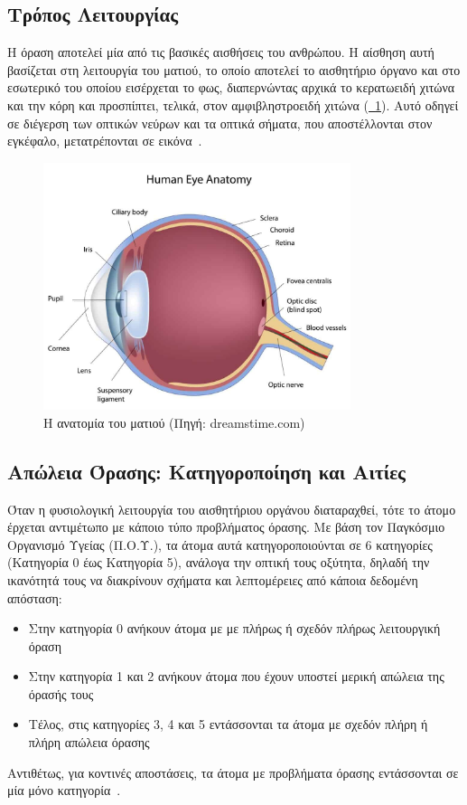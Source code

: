 \subsection{Τρόπος Λειτουργίας}\label{subsec:visionDefinition}
Η όραση αποτελεί μία από τις βασικές αισθήσεις του ανθρώπου. Η αίσθηση αυτή βασίζεται στη λειτουργία του ματιού, το οποίο αποτελεί το αισθητήριο όργανο και στο εσωτερικό του οποίου εισέρχεται το φως, διαπερνώντας αρχικά το κερατωειδή χιτώνα και την κόρη και προσπίπτει, τελικά, στον αμφιβληστροειδή χιτώνα (\hyperref[fig:eye_anatomy]{\schema~\ref*{fig:eye_anatomy}}). Αυτό οδηγεί σε διέγερση των οπτικών νεύρων και τα οπτικά σήματα, που αποστέλλονται στον εγκέφαλο, μετατρέπονται σε εικόνα~\cite{nationaleyeinstitute_2022_how}\cite{anspaugh_2022_vision}.

\begin{figure}[!h]
  \centering
  \includegraphics[width=90mm]{images/eye_anatomy.jpg}
  \caption[Η ανατομία του ματιού]{Η ανατομία του ματιού {\footnotesize(Πηγή: dreamstime.com)}}\label{fig:eye_anatomy}
\end{figure}

\subsection{Απώλεια Όρασης: Κατηγοροποίηση και Αιτίες}\label{subsec:visionCauses}
Όταν η φυσιολογική λειτουργία του αισθητήριου οργάνου διαταραχθεί, τότε το άτομο έρχεται αντιμέτωπο με κάποιο τύπο προβλήματος όρασης. Με βάση τον Παγκόσμιο Οργανισμό Υγείας (Π.Ο.Υ.), τα άτομα αυτά κατηγοροποιούνται σε 6 κατηγορίες (Κατηγορία 0 έως Κατηγορία 5), ανάλογα την οπτική τους οξύτητα, δηλαδή την ικανότητά τους να διακρίνουν σχήματα και λεπτομέρειες από κάποια δεδομένη απόσταση:
\begin{itemize}
    \item Στην κατηγορία 0 ανήκουν άτομα με με πλήρως ή σχεδόν πλήρως λειτουργική όραση
    \item Στην κατηγορία 1 και 2 ανήκουν άτομα που έχουν υποστεί μερική απώλεια της όρασής τους
    \item Τέλος, στις κατηγορίες 3, 4 και 5 εντάσσονται τα άτομα με σχεδόν πλήρη ή πλήρη απώλεια όρασης
\end{itemize}
Αντιθέτως, για κοντινές αποστάσεις, τα άτομα με προβλήματα όρασης εντάσσονται σε μία μόνο κατηγορία~\cite{worldhealthorganization_2019_world}.

